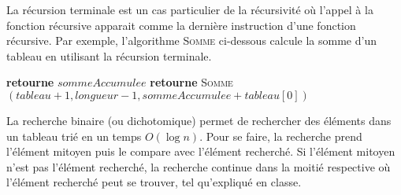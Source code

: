\documentclass[11pt,addpoints]{exam}
\begin{document}
\begin{questions}
\newpage

\question
La récursion terminale est un cas particulier de la récursivité où l'appel à la fonction récursive apparait comme la dernière instruction d'une fonction récursive. Par exemple, l'algorithme \textsc{Somme} ci-dessous calcule la somme d'un tableau en utilisant la récursion terminale.

\algrenewcommand{}
\algrenewcommand{}
\algrenewcommand{}
\algrenewcommand{}
\algrenewcommand{}
\algrenewcommand\algorithmicdo{\textbf{}}
\algrenewcommand{}
\begin{algorithm}
\begin{algorithmic}[1]
\State \textbf{retourne} $sommeAccumulee$
\Else
\State \textbf{retourne} \textsc{Somme}$(tableau+1, longueur-1, sommeAccumulee+tableau[0])$
\EndIf
\EndFunction
\end{algorithmic}
\end{algorithm}


\question[2]
La recherche binaire (ou dichotomique) permet de rechercher des éléments dans un tableau trié en
un temps $O(\log n)$. Pour se faire, la recherche prend l'élément mitoyen puis
le compare avec l'élément recherché. Si l'élément mitoyen n'est pas l'élément
recherché, la recherche continue dans la moitié respective où l'élément
recherché peut se trouver, tel qu'expliqué en classe.


\end{questions}
\end{document}
